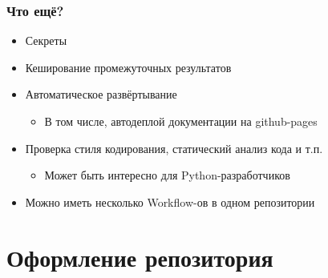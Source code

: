 \documentclass{../../slides-style}
\begin{document}
    \begin{frame}
        \frametitle{Что ещё?}
        \begin{itemize}
            \item Секреты
            \item Кеширование промежуточных результатов
            \item Автоматическое развёртывание
            \begin{itemize}
                \item В том числе, автодеплой документации на github-pages
            \end{itemize}
            \item Проверка стиля кодирования, статический анализ кода и т.п.
            \begin{itemize}
                \item Может быть интересно для Python-разработчиков
            \end{itemize}
            \item Можно иметь несколько Workflow-ов в одном репозитории
        \end{itemize}
    \end{frame}

    \section{Оформление репозитория}
\end{document}

